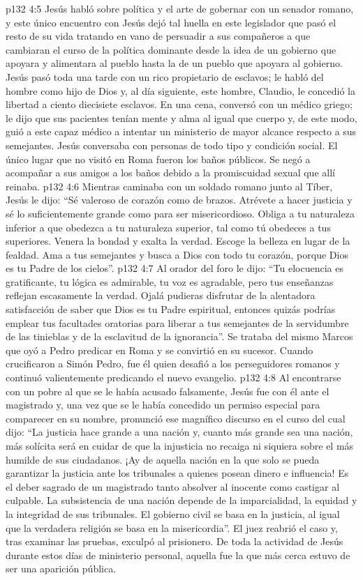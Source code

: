 \vs p132 4:5 \pc Jesús habló sobre política y el arte de gobernar con un senador romano, y este único encuentro con Jesús dejó tal huella en este legislador que pasó el resto de su vida tratando en vano de persuadir a sus compañeros a que cambiaran el curso de la política dominante desde la idea de un gobierno que apoyara y alimentara al pueblo hasta la de un pueblo que apoyara al gobierno. Jesús pasó toda una tarde con un rico propietario de esclavos; le habló del hombre como hijo de Dios y, al día siguiente, este hombre, Claudio, le concedió la libertad a ciento diecisiete esclavos. En una cena, conversó con un médico griego; le dijo que sus pacientes tenían mente y alma al igual que cuerpo y, de este modo, guió a este capaz médico a intentar un ministerio de mayor alcance respecto a sus semejantes. Jesús conversaba con personas de todo tipo y condición social. El único lugar que no visitó en Roma fueron los baños públicos. Se negó a acompañar a sus amigos a los baños debido a la promiscuidad sexual que allí reinaba.
\vs p132 4:6 \pc Mientras caminaba con un soldado romano junto al Tíber, Jesús le dijo: “Sé valeroso de corazón como de brazos. Atrévete a hacer justicia y sé lo suficientemente grande como para ser misericordioso. Obliga a tu naturaleza inferior a que obedezca a tu naturaleza superior, tal como tú obedeces a tus superiores. Venera la bondad y exalta la verdad. Escoge la belleza en lugar de la fealdad. Ama a tus semejantes y busca a Dios con todo tu corazón, porque Dios es tu Padre de los cielos”.
\vs p132 4:7 \pc Al orador del foro le dijo: “Tu elocuencia es gratificante, tu lógica es admirable, tu voz es agradable, pero tus enseñanzas reflejan escasamente la verdad. Ojalá pudieras disfrutar de la alentadora satisfacción de saber que Dios es tu Padre espiritual, entonces quizás podrías emplear tus facultades oratorias para liberar a tus semejantes de la servidumbre de las tinieblas y de la esclavitud de la ignorancia”. Se trataba del mismo Marcos que oyó a Pedro predicar en Roma y se convirtió en su sucesor. Cuando crucificaron a Simón Pedro, fue él quien desafió a los perseguidores romanos y continuó valientemente predicando el nuevo evangelio.
\vs p132 4:8 \pc Al encontrarse con un pobre al que se le había acusado falsamente, Jesús fue con él ante el magistrado y, una vez que se le había concedido un permiso especial para comparecer en su nombre, pronunció ese magnífico discurso en el curso del cual dijo: “La justicia hace grande a una nación y, cuanto más grande sea una nación, más solícita será en cuidar de que la injusticia no recaiga ni siquiera sobre el más humilde de sus ciudadanos. ¡Ay de aquella nación en la que solo se pueda garantizar la justicia ante los tribunales a quienes posean dinero e influencia! Es el deber sagrado de un magistrado tanto absolver al inocente como castigar al culpable. La subsistencia de una nación depende de la imparcialidad, la equidad y la integridad de sus tribunales. El gobierno civil se basa en la justicia, al igual que la verdadera religión se basa en la misericordia”. El juez reabrió el caso y, tras examinar las pruebas, exculpó al prisionero. De toda la actividad de Jesús durante estos días de ministerio personal, aquella fue la que más cerca estuvo de ser una aparición pública.
